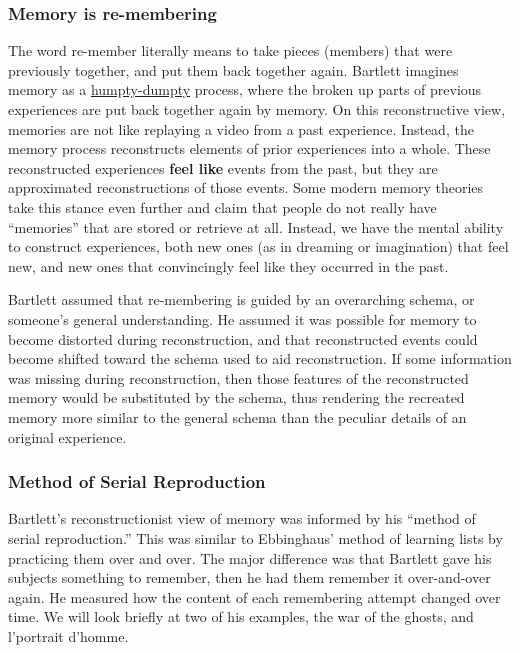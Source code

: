 \documentclass[
  oneside,
  12pt]{crumpbook}
\begin{document}
\hypertarget{memory-is-re-membering}{%
\subsubsection{Memory is re-membering}\label{memory-is-re-membering}}

The word re-member literally means to take pieces (members) that were previously together, and put them back together again. Bartlett imagines memory as a \href{https://en.wikipedia.org/wiki/Humpty_Dumpty}{humpty-dumpty} process, where the broken up parts of previous experiences are put back together again by memory. On this reconstructive view, memories are not like replaying a video from a past experience. Instead, the memory process reconstructs elements of prior experiences into a whole. These reconstructed experiences \textbf{feel like} events from the past, but they are approximated reconstructions of those events. Some modern memory theories take this stance even further and claim that people do not really have ``memories'' that are stored or retrieve at all. Instead, we have the mental ability to construct experiences, both new ones (as in dreaming or imagination) that feel new, and new ones that convincingly feel like they occurred in the past.

Bartlett assumed that re-membering is guided by an overarching schema, or someone's general understanding. He assumed it was possible for memory to become distorted during reconstruction, and that reconstructed events could become shifted toward the schema used to aid reconstruction. If some information was missing during reconstruction, then those features of the reconstructed memory would be substituted by the schema, thus rendering the recreated memory more similar to the general schema than the peculiar details of an original experience.

\hypertarget{method-of-serial-reproduction}{%
\subsubsection{Method of Serial Reproduction}\label{method-of-serial-reproduction}}

Bartlett's reconstructionist view of memory was informed by his ``method of serial reproduction.'' This was similar to Ebbinghaus' method of learning lists by practicing them over and over. The major difference was that Bartlett gave his subjects something to remember, then he had them remember it over-and-over again. He measured how the content of each remembering attempt changed over time. We will look briefly at two of his examples, the war of the ghosts, and l'portrait d'homme.
\end{document}
